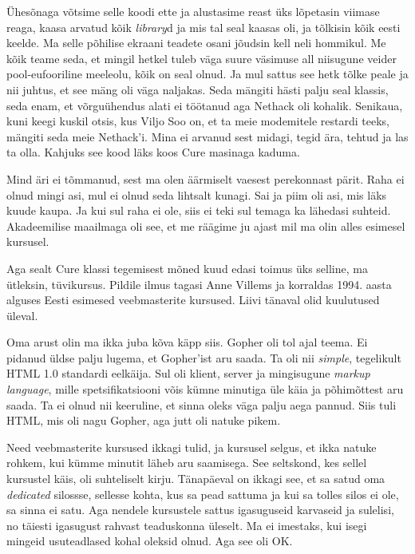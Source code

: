 Ühesõnaga võtsime selle koodi ette ja alustasime reast üks lõpetasin viimase 
reaga, kaasa arvatud kõik \emph{library}d ja mis tal seal kaasas oli, ja 
tõlkisin  kõik eesti keelde. Ma selle põhilise ekraani teadete osani jõudsin 
kell neli hommikul. Me kõik teame seda, et mingil hetkel tuleb  
väga suure väsimuse all niisugune veider pool-eufooriline meeleolu, kõik on 
seal olnud. Ja mul sattus see hetk tõlke peale ja nii juhtus, et see 
mäng oli väga naljakas. Seda mängiti hästi palju seal klassis, seda enam, et 
võrguühendus alati ei töötanud aga Nethack oli kohalik. Senikaua, 
kuni keegi kuskil otsis, kus Viljo Soo on, et ta meie 
modemitele restardi teeks, mängiti seda meie Nethack'i. Mina ei arvanud sest 
midagi, tegid ära, tehtud ja las ta olla. Kahjuks see kood läks koos Cure 
masinaga kaduma.


Mind äri ei tõmmanud, sest ma olen äärmiselt vaesest perekonnast pärit. Raha ei 
olnud mingi asi, mul ei olnud seda lihtsalt kunagi. Sai ja piim oli asi, mis 
läks kuude kaupa. Ja kui sul raha ei ole, siis ei teki sul temaga ka lähedasi 
suhteid. Akadeemilise maailmaga oli see, et me räägime ju ajast mil ma olin 
alles esimesel kursusel.

Aga sealt Cure klassi tegemisest mõned kuud edasi toimus üks selline, ma 
ütleksin, tüvikursus. Pildile ilmus tagasi Anne Villems ja korraldas 1994. aasta alguses Eesti esimesed veebmasterite kursused. 
Liivi tänaval olid kuulutused üleval.

Oma arust olin ma ikka juba kõva käpp siis. 
Gopher oli tol ajal teema. Ei pidanud üldse palju lugema, et 
Gopher'ist aru saada. Ta oli nii \emph{simple},  tegelikult  HTML 1.0 standardi 
eelkäija. Sul oli klient, server ja mingisugune \emph{markup language}, mille 
spetsifikatsiooni võis kümne minutiga üle käia ja põhimõttest aru saada. Ta ei 
olnud nii keeruline, et sinna  oleks väga palju aega pannud. Siis tuli HTML, 
mis oli nagu Gopher, aga jutt oli natuke pikem. 

Need veebmasterite kursused ikkagi tulid, ja kursusel selgus, et ikka natuke 
rohkem, kui kümme minutit läheb aru saamisega. See seltskond, kes sellel kursustel käis, oli 
suhteliselt kirju. Tänapäeval on ikkagi see, et sa satud oma \emph{dedicated} 
silossse, sellesse kohta, kus sa pead sattuma ja kui sa tolles silos ei ole, sa 
sinna ei satu. Aga nendele kursustele sattus igasuguseid karvaseid ja sulelisi, 
no täiesti igasugust rahvast teaduskonna üleselt. Ma ei imestaks, kui isegi 
mingeid usuteadlased kohal oleksid olnud. Aga see oli OK.

